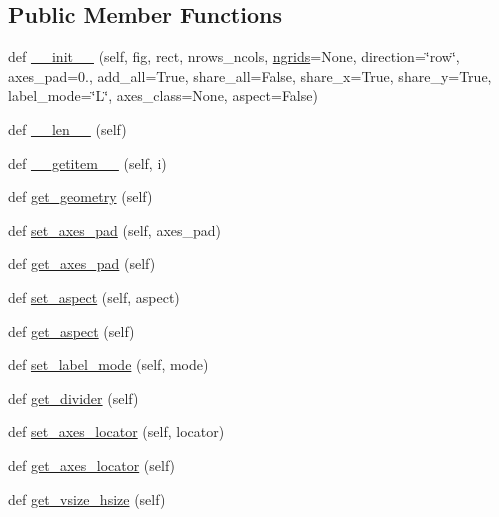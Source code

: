 \subsection*{Public Member Functions}
\begin{DoxyCompactItemize}
\item 
def \hyperlink{classaxes__grid1_1_1axes__grid_1_1Grid_ae3f8ee007aef094379548c45547b1c16}{\+\_\+\+\_\+init\+\_\+\+\_\+} (self, fig, rect, nrows\+\_\+ncols, \hyperlink{classaxes__grid1_1_1axes__grid_1_1Grid_ac03a9489d1bf668d1c2e7a476093cf2a}{ngrids}=None, direction=\char`\"{}row\char`\"{}, axes\+\_\+pad=0., add\+\_\+all=True, share\+\_\+all=False, share\+\_\+x=True, share\+\_\+y=True, label\+\_\+mode=\char`\"{}L\char`\"{}, axes\+\_\+class=None, aspect=False)
\item 
def \hyperlink{classaxes__grid1_1_1axes__grid_1_1Grid_afea581ac8473688e318f854ab380fcc8}{\+\_\+\+\_\+len\+\_\+\+\_\+} (self)
\item 
def \hyperlink{classaxes__grid1_1_1axes__grid_1_1Grid_ad79f2415eb561d64e509f4e8a54b35e8}{\+\_\+\+\_\+getitem\+\_\+\+\_\+} (self, i)
\item 
def \hyperlink{classaxes__grid1_1_1axes__grid_1_1Grid_a2876f89ad544d0291561c968644f38d0}{get\+\_\+geometry} (self)
\item 
def \hyperlink{classaxes__grid1_1_1axes__grid_1_1Grid_a8381261e69dbcc0264711cd7978cf16d}{set\+\_\+axes\+\_\+pad} (self, axes\+\_\+pad)
\item 
def \hyperlink{classaxes__grid1_1_1axes__grid_1_1Grid_af68c980b4318ec453ca99d41eb8eb081}{get\+\_\+axes\+\_\+pad} (self)
\item 
def \hyperlink{classaxes__grid1_1_1axes__grid_1_1Grid_a883ac6f0329e47f4747d5082214b6f15}{set\+\_\+aspect} (self, aspect)
\item 
def \hyperlink{classaxes__grid1_1_1axes__grid_1_1Grid_a8d3e6553096908e27d9d960006086721}{get\+\_\+aspect} (self)
\item 
def \hyperlink{classaxes__grid1_1_1axes__grid_1_1Grid_a543d9f62735ef651e376c890748b2344}{set\+\_\+label\+\_\+mode} (self, mode)
\item 
def \hyperlink{classaxes__grid1_1_1axes__grid_1_1Grid_adb474c19f186cd685884ae1260ef0ab8}{get\+\_\+divider} (self)
\item 
def \hyperlink{classaxes__grid1_1_1axes__grid_1_1Grid_a3e74b966dbc13e41ee34a81254f82037}{set\+\_\+axes\+\_\+locator} (self, locator)
\item 
def \hyperlink{classaxes__grid1_1_1axes__grid_1_1Grid_acd70ec9af0da89bfe9008802492a9b9e}{get\+\_\+axes\+\_\+locator} (self)
\item 
def \hyperlink{classaxes__grid1_1_1axes__grid_1_1Grid_a1d56995b13dcf055b75821f079636d29}{get\+\_\+vsize\+\_\+hsize} (self)
\end{DoxyCompactItemize}
